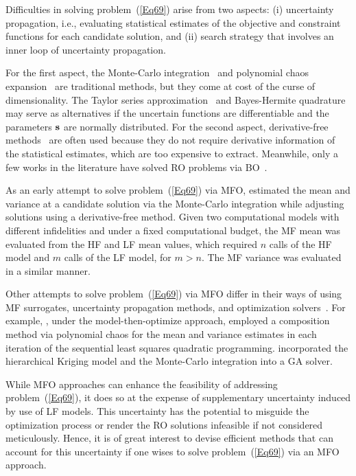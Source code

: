 \documentclass[iicol,sn-basic]{sn-jnl}%
\begin{document}
Difficulties in solving problem~(\ref{Eq69}) arise from two aspects: (i) uncertainty propagation, i.e., evaluating statistical estimates of the objective and constraint functions for each candidate solution, and (ii) search strategy that involves an inner loop of uncertainty propagation.

For the first aspect, the Monte-Carlo integration~\citep{Caflisch1998} and polynomial chaos expansion~\citep{Crestaux2009} are traditional methods, but they come at cost of the curse of dimensionality.
The Taylor series approximation~\citep{Anderson2012} and Bayes-Hermite quadrature~\citep{OHagan1991} may serve as alternatives if the uncertain functions are differentiable and the parameters $\bf s$ are normally distributed.
For the second aspect, derivative-free methods~\citep{Larson2019} are often used because they do not require derivative information of the statistical estimates, which are too expensive to extract.
Meanwhile, only a few works in the literature have solved RO problems via BO~\citep{Do2021,Daulton2022RMOBO}. 

As an early attempt to solve problem~(\ref{Eq69}) via MFO, \cite{Ng2014} estimated the mean and variance at a candidate solution via the Monte-Carlo integration while adjusting solutions using a derivative-free method.
Given two computational models with different infidelities and under a fixed computational budget, the MF mean was evaluated from the HF and LF mean values, which required $n$ calls of the HF model and $m$ calls of the LF model, for $m>n$.
The MF variance was evaluated in a similar manner.

Other attempts to solve problem~(\ref{Eq69}) via MFO differ in their ways of using MF surrogates, uncertainty propagation methods, and optimization solvers~\citep[see e.g.,][]{Shah2015,Fusi2015,Chakraborty2017,Zhou2018}.
For example, \cite{Shah2015}, under the model-then-optimize approach, employed a composition method via polynomial chaos for the mean and variance estimates in each iteration of the sequential least squares quadratic programming.
\cite{Zhou2018} incorporated the hierarchical Kriging model and the Monte-Carlo integration into a GA solver.

While MFO approaches can enhance the feasibility of addressing problem~(\ref{Eq69}), it does so at the expense of supplementary uncertainty induced by use of LF models.
This uncertainty has the potential to misguide the optimization process or render the RO solutions infeasible if not considered meticulously. 
Hence, it is of great interest to devise efficient methods that can account for this uncertainty if one wises to solve problem~(\ref{Eq69}) via an MFO approach.
\end{document}
